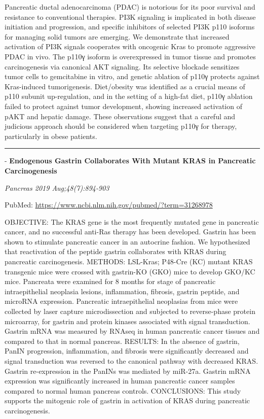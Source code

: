 \documentclass[]{article}
\begin{document}
Pancreatic ductal adenocarcinoma (PDAC) is notorious for its poor
survival and resistance to conventional therapies. PI3K signaling is
implicated in both disease initiation and progression, and specific
inhibitors of selected PI3K p110 isoforms for managing solid tumors are
emerging. We demonstrate that increased activation of PI3K signals
cooperates with oncogenic Kras to promote aggressive PDAC in vivo. The
p110γ isoform is overexpressed in tumor tissue and promotes
carcinogenesis via canonical AKT signaling. Its selective blockade
sensitizes tumor cells to gemcitabine in vitro, and genetic ablation of
p110γ protects against Kras-induced tumorigenesis. Diet/obesity was
identified as a crucial means of p110 subunit up-regulation, and in the
setting of a high-fat diet, p110γ ablation failed to protect against
tumor development, showing increased activation of pAKT and hepatic
damage. These observations suggest that a careful and judicious approach
should be considered when targeting p110γ for therapy, particularly in
obese patients.

{}

{}

\begin{center}\rule{0.5\linewidth}{\linethickness}\end{center}

 - \textbf{Endogenous Gastrin Collaborates With Mutant KRAS in
Pancreatic Carcinogenesis}

\emph{Pancreas 2019 Aug;48(7):894-903}

PubMed: \url{https://www.ncbi.nlm.nih.gov/pubmed/?term=31268978}

OBJECTIVE: The KRAS gene is the most frequently mutated gene in
pancreatic cancer, and no successful anti-Ras therapy has been
developed. Gastrin has been shown to stimulate pancreatic cancer in an
autocrine fashion. We hypothesized that reactivation of the peptide
gastrin collaborates with KRAS during pancreatic carcinogenesis.
METHODS: LSL-Kras; P48-Cre (KC) mutant KRAS transgenic mice were crossed
with gastrin-KO (GKO) mice to develop GKO/KC mice. Pancreata were
examined for 8 months for stage of pancreatic intraepithelial neoplasia
lesions, inflammation, fibrosis, gastrin peptide, and microRNA
expression. Pancreatic intraepithelial neoplasias from mice were
collected by laser capture microdissection and subjected to
reverse-phase protein microarray, for gastrin and protein kinases
associated with signal transduction. Gastrin mRNA was measured by RNAseq
in human pancreatic cancer tissues and compared to that in normal
pancreas. RESULTS: In the absence of gastrin, PanIN progression,
inflammation, and fibrosis were significantly decreased and signal
transduction was reversed to the canonical pathway with decreased KRAS.
Gastrin re-expression in the PanINs was mediated by miR-27a. Gastrin
mRNA expression was significantly increased in human pancreatic cancer
samples compared to normal human pancreas controls. CONCLUSIONS: This
study supports the mitogenic role of gastrin in activation of KRAS
during pancreatic carcinogenesis.
\end{document}
